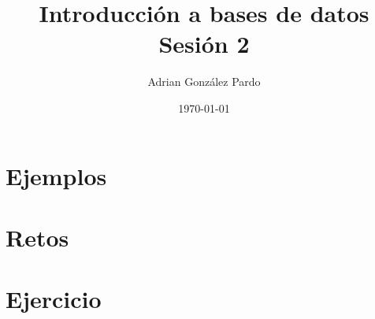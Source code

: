 \documentclass[10pt]{article}
\title{Introducción a bases de datos\\Sesión 2}
\author{Adrian González Pardo}
\date{\today}
\begin{document}
\maketitle
\section{Ejemplos}
\begin{center}
  
  
  
  
\end{center}
\clearpage
\section{Retos}
\begin{center}
  
  
  
  
\end{center}
\clearpage
\section{Ejercicio}
\begin{center}
  
\end{center}
\end{document}
